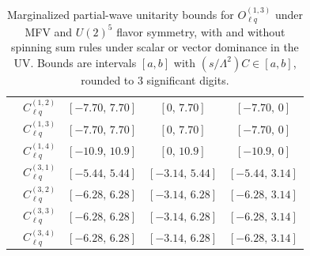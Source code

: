 \begin{table}[htbp]
{\begin{tabular}{ccccc}
        & $C_{\ell q}^{(1,2)}$ & $[-7.70,\, 7.70]$ & $[0,\, 7.70]$      & $[-7.70,\, 0]$    \\
        & $C_{\ell q}^{(1,3)}$ & $[-7.70,\, 7.70]$ & $[0,\, 7.70]$      & $[-7.70,\, 0]$    \\
        & $C_{\ell q}^{(1,4)}$ & $[-10.9,\, 10.9]$ & $[0,\, 10.9]$      & $[-10.9,\, 0]$    \\
        & $C_{\ell q}^{(3,1)}$ & $[-5.44,\, 5.44]$ & $[-3.14,\, 5.44]$  & $[-5.44,\, 3.14]$ \\
        & $C_{\ell q}^{(3,2)}$ & $[-6.28,\, 6.28]$ & $[-3.14,\, 6.28]$  & $[-6.28,\, 3.14]$ \\
        & $C_{\ell q}^{(3,3)}$ & $[-6.28,\, 6.28]$ & $[-3.14,\, 6.28]$  & $[-6.28,\, 3.14]$ \\
        & $C_{\ell q}^{(3,4)}$ & $[-6.28,\, 6.28]$ & $[-3.14,\, 6.28]$  & $[-6.28,\, 3.14]$ \\
    \bottomrule
\end{tabular}}
\caption{Marginalized partial-wave unitarity bounds for $O_{\ell q}^{(1,3)}$ under MFV and $U(2)^5$
flavor symmetry, with and without spinning sum rules under scalar or vector dominance in the UV.
Bounds are intervals $[a,b]$ with $(s/\Lambda^2)C \in [a,b]$, rounded to 3 significant digits.}
\label{tab:Olq_UB}
\end{table}

